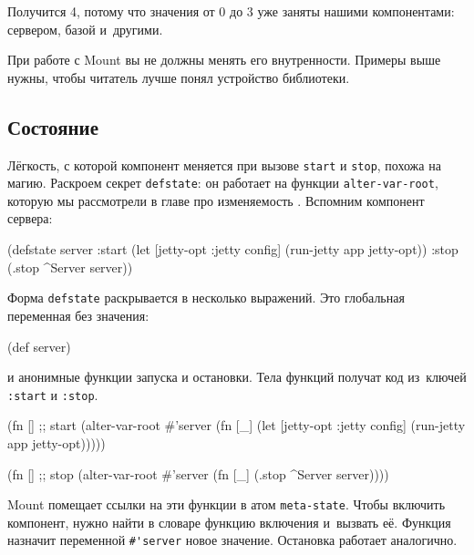 \noindent
Получится 4, потому что значения от 0 до 3 уже заняты нашими компонентами:
сервером, базой и~другими.

При работе с Mount вы не должны менять его внутренности. Примеры выше нужны,
чтобы читатель лучше понял устройство библиотеки.

\subsection{Состояние}


Лёгкость, с которой компонент меняется при вызове \verb|start| и
\verb|stop|, похожа на магию. Раскроем секрет \verb|defstate|: он работает на
функции \verb|alter-var-root|, которую мы рассмотрели в главе про
изменяемость . Вспомним компонент сервера:

\begin{english}
  \begin{clojure}
(defstate server
  :start
  (let [{jetty-opt :jetty} config]
    (run-jetty app jetty-opt))
  :stop
  (.stop ^Server server))
  \end{clojure}
\end{english}

Форма \verb|defstate| раскрывается в несколько выражений. Это глобальная
переменная без значения:


\begin{english}
  \begin{clojure}
(def server)
  \end{clojure}
\end{english}

\noindent
и анонимные функции запуска и остановки. Тела функций получат код из~ключей
\verb|:start| и \verb|:stop|.

\begin{english}
  \begin{clojure}
(fn [] ;; start
  (alter-var-root #'server
   (fn [_]
     (let [{jetty-opt :jetty} config]
       (run-jetty app jetty-opt)))))

(fn [] ;; stop
  (alter-var-root #'server
   (fn [_]
     (.stop ^Server server))))
  \end{clojure}
\end{english}

Mount помещает ссылки на эти функции в атом \verb|meta-state|. Чтобы включить
компонент, нужно найти в словаре функцию включения и~вызвать её. Функция
назначит переменной \verb|#'server| новое значение. Остановка работает
аналогично.


